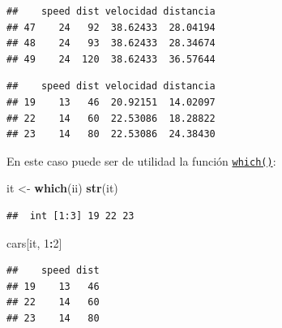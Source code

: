 \documentclass[
]{book}
\newenvironment{Shaded}{\begin{snugshade}}{\end{snugshade}}
\newcommand{\CommentTok}[1]{\textcolor[rgb]{0.56,0.35,0.01}{\textit{#1}}}
\newcommand{\DecValTok}[1]{\textcolor[rgb]{0.00,0.00,0.81}{#1}}
\newcommand{\FunctionTok}[1]{\textcolor[rgb]{0.13,0.29,0.53}{\textbf{#1}}}
\newcommand{\NormalTok}[1]{#1}
\newcommand{\OtherTok}[1]{\textcolor[rgb]{0.56,0.35,0.01}{#1}}
\newcommand{\SpecialCharTok}[1]{\textcolor[rgb]{0.81,0.36,0.00}{\textbf{#1}}}
\begin{document}
\begin{verbatim}
##    speed dist velocidad distancia
## 47    24   92  38.62433  28.04194
## 48    24   93  38.62433  28.34674
## 49    24  120  38.62433  36.57644
\end{verbatim}

\begin{Shaded}
\end{Shaded}

\begin{verbatim}
##    speed dist velocidad distancia
## 19    13   46  20.92151  14.02097
## 22    14   60  22.53086  18.28822
## 23    14   80  22.53086  24.38430
\end{verbatim}

En este caso puede ser de utilidad la función \href{https://www.rdocumentation.org/packages/base/versions/3.6.1/topics/which}{\texttt{which()}}:

\begin{Shaded}
\begin{Highlighting}[]
\NormalTok{it }\OtherTok{\textless{}{-}} \FunctionTok{which}\NormalTok{(ii)}
\FunctionTok{str}\NormalTok{(it)}
\end{Highlighting}
\end{Shaded}

\begin{verbatim}
##  int [1:3] 19 22 23
\end{verbatim}

\begin{Shaded}
\begin{Highlighting}[]
\NormalTok{cars[it, }\DecValTok{1}\SpecialCharTok{:}\DecValTok{2}\NormalTok{]}
\end{Highlighting}
\end{Shaded}

\begin{verbatim}
##    speed dist
## 19    13   46
## 22    14   60
## 23    14   80
\end{verbatim}
\end{document}
